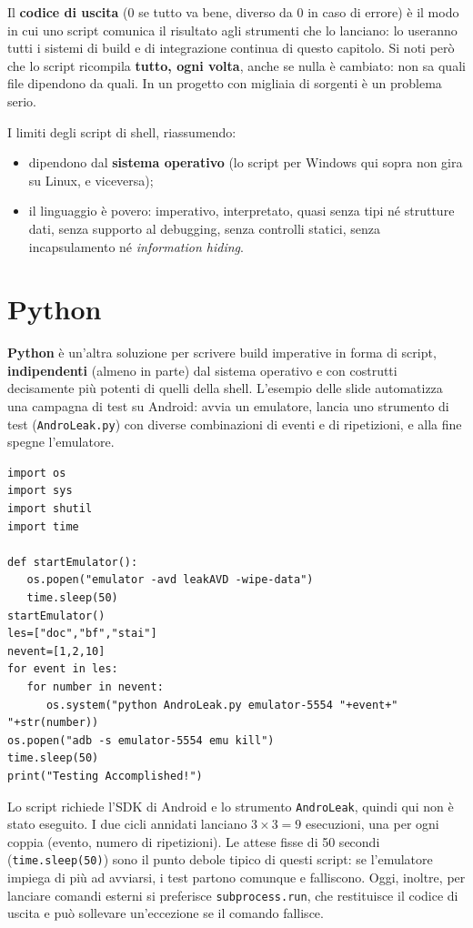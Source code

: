 Il \textbf{codice di uscita} (0 se tutto va bene, diverso da 0 in caso di errore) è il modo in cui uno script comunica
il risultato agli strumenti che lo lanciano: lo useranno tutti i sistemi di build e di integrazione continua di questo
capitolo. Si noti però che lo script ricompila \textbf{tutto, ogni volta}, anche se nulla è cambiato: non sa quali file
dipendono da quali. In un progetto con migliaia di sorgenti è un problema serio.

I limiti degli script di shell, riassumendo:

\begin{itemize}
  \item dipendono dal \textbf{sistema operativo} (lo script per Windows qui sopra non gira su Linux, e viceversa);
  \item il linguaggio è povero: imperativo, interpretato, quasi senza tipi né strutture dati, senza supporto al
        debugging, senza controlli statici, senza incapsulamento né \textit{information hiding}.
\end{itemize}

\section{Python}

\textbf{Python} è un'altra soluzione per scrivere build imperative in forma di script, \textbf{indipendenti} (almeno in
parte) dal sistema operativo e con costrutti decisamente più potenti di quelli della shell. L'esempio delle slide
automatizza una campagna di test su Android: avvia un emulatore, lancia uno strumento di test (\texttt{AndroLeak.py}) con
diverse combinazioni di eventi e di ripetizioni, e alla fine spegne l'emulatore.

\begin{lstlisting}[style=plain, name=test_campagna.py]
import os
import sys
import shutil
import time

def startEmulator():
   os.popen("emulator -avd leakAVD -wipe-data")
   time.sleep(50)
startEmulator()
les=["doc","bf","stai"]
nevent=[1,2,10]
for event in les:
   for number in nevent:
      os.system("python AndroLeak.py emulator-5554 "+event+" "+str(number))
os.popen("adb -s emulator-5554 emu kill")
time.sleep(50)
print("Testing Accomplished!")
\end{lstlisting}

Lo script richiede l'SDK di Android e lo strumento \texttt{AndroLeak}, quindi qui non è stato eseguito. I due cicli
annidati lanciano \(3 \times 3 = 9\) esecuzioni, una per ogni coppia (evento, numero di ripetizioni). Le attese fisse di
50 secondi (\texttt{time.sleep(50)}) sono il punto debole tipico di questi script: se l'emulatore impiega di più ad
avviarsi, i test partono comunque e falliscono. Oggi, inoltre, per lanciare comandi esterni si preferisce
\texttt{subprocess.run}, che restituisce il codice di uscita e può sollevare un'eccezione se il comando fallisce.

